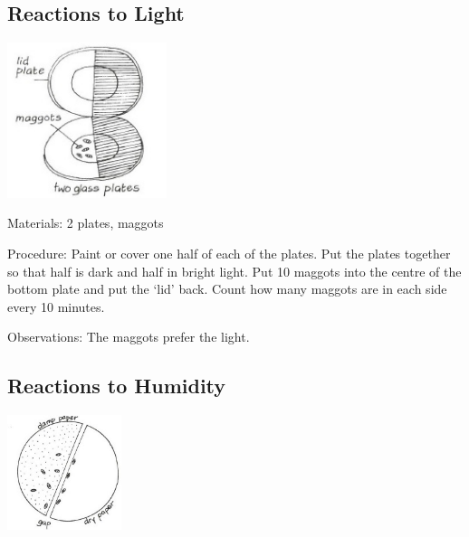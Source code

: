 \begin{multicols}{2}
\subsection{Reactions to Light} %

\begin{center}
\includegraphics[width=0.35\textwidth]{./img/vso/reactions-light.jpg}
\end{center}

\begin{description*}
\item[Materials:]{2 plates, maggots}
\item[Procedure:]{Paint or cover one half of each of
the plates. Put the plates together
so that half is dark and half in
bright light. Put 10 maggots into
the centre of the bottom plate
and put the `lid' back. Count how
many maggots are in each side
every 10 minutes.}
\item[Observations:]{The maggots prefer the light.}
\end{description*}

\columnbreak

\subsection{Reactions to Humidity}

\begin{center}
\includegraphics[width=0.25\textwidth]{./img/vso/reactions-humidity.jpg}
\end{center}


\end{multicols}
